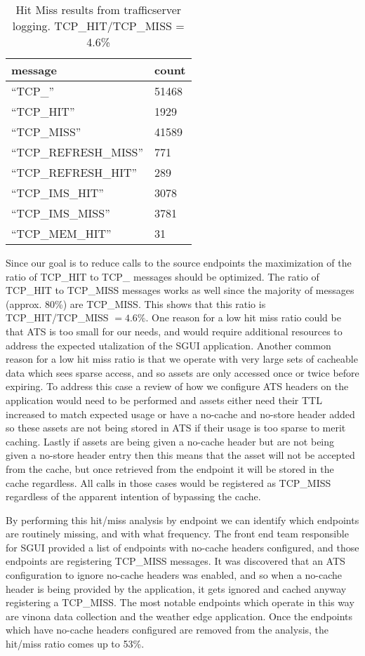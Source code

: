 \documentclass{article}
\begin{document}
\begin{table}[h]
\centering
\begin{tabular}{|l|l|} 
\hline message & count \\  
\hline ``TCP\_'' & 51468 \\
\hline ``TCP\_HIT'' & 1929 \\
\hline ``TCP\_MISS'' & 41589 \\
\hline ``TCP\_REFRESH\_MISS'' & 771 \\
\hline ``TCP\_REFRESH\_HIT'' & 289 \\
\hline ``TCP\_IMS\_HIT'' & 3078 \\
\hline ``TCP\_IMS\_MISS'' & 3781 \\
\hline ``TCP\_MEM\_HIT'' & 31 \\
\hline
\end{tabular}
\caption{\label{TABLE-HITMISS} Hit Miss results from trafficserver logging. TCP\_HIT/TCP\_MISS = 4.6\% } 
\end{table}

Since our goal is to reduce calls to the source endpoints the maximization of the ratio of TCP\_HIT  to TCP\_ messages should be optimized. The ratio of TCP\_HIT to TCP\_MISS messages works as well since the majority of messages (approx. 80\%) are TCP\_MISS. This shows that this ratio is TCP\_HIT/TCP\_MISS $= 4.6\%$. One reason for a low hit miss ratio could be that ATS is too small for our needs, and would require additional resources to address the expected utalization of the SGUI application. Another common reason for a low hit miss ratio is that we operate with very large sets of cacheable data which sees sparse access, and so assets are only accessed once or twice before expiring. To address this case a review of how we configure ATS headers on the application would need to be performed and assets either need their TTL increased to match expected usage or have a no-cache and no-store header added so these assets are not being stored in ATS if their usage is too sparse to merit caching. Lastly if assets are being given a no-cache header but are not being given a no-store header entry then this means that the asset will not be accepted from the cache, but once retrieved from the endpoint it will be stored in the cache regardless. All calls in those cases would be registered as TCP\_MISS regardless of the apparent intention of bypassing the cache. 

By performing this hit/miss analysis by endpoint we can identify which endpoints are routinely missing, and with what frequency. The front end team responsible for SGUI provided a list of endpoints with no-cache headers configured, and those endpoints are registering TCP\_MISS messages. It was discovered that an ATS configuration to ignore no-cache headers was enabled, and so when a no-cache header is being provided by the application, it gets ignored and cached anyway registering a TCP\_MISS. The most notable endpoints which operate in this way are vinona data collection and the weather edge application. Once the endpoints which have no-cache headers configured are removed from the analysis, the hit/miss ratio comes up to 53\%. 
\end{document}
